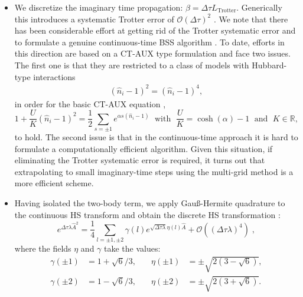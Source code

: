 \begin{itemize}
\item  We discretize the imaginary time propagation: $\beta = \Delta \tau L_{\text{Trotter}} $. Generically this introduces a systematic Trotter error of $\mathcal{O}(\Delta \tau)^2$  \cite{Fye86}. 
We note that there has been considerable effort at getting rid of the Trotter systematic error and to formulate a genuine continuous-time BSS  algorithm \cite{Iazzi15}.   To date, efforts in this direction are based on a CT-AUX type formulation \cite{Rombouts99,Gull08} and face two issues. The first one is that they are restricted to a class of models with Hubbard-type interactions
\begin{align}
        (\hat{n}_{i}- 1)^{2}  = (\hat{n}_{i}- 1)^{4} ,
\end{align}
in order for the basic CT-AUX equation \cite{Rombouts98},
\begin{equation}
          1   + \frac{U}{K} \left(  \hat{n}_{i}- 1\right)^{2}    = \frac{1}{2}\sum_{s=\pm 1}   e^{ \alpha s \left(  \hat{n}_{i}- 1\right) }  \; \text{ with  }  \;  \frac{U}{K} = \cosh(\alpha) -1 \; \text{ and  }  \; K\in\mathbb{R},
\end{equation}
to hold.
The second issue is that in the continuous-time  approach it is hard to formulate a  computationally efficient algorithm.  Given this situation, if eliminating the Trotter systematic error is required, it turns out that extrapolating to small imaginary-time steps using the multi-grid method \cite{Rost12,Rost13,Bluemer08} is a more efficient scheme.
\item  Having isolated the two-body term, we apply Gau\ss{}-Hermite quadrature \cite{goth2020} to the 
continuous HS transform and obtain the discrete HS transformation \cite{Motome97,Assaad97}:
\begin{equation}
\label{HS_squares}
        e^{\Delta \tau  \lambda  \hat{A}^2 } = \frac{1}{4}
        \sum_{ l = \pm 1, \pm 2}  \gamma(l)
e^{ \sqrt{\Delta \tau \lambda }
       \eta(l)  \hat{A} }
                + \mathcal{O} \left(  (\Delta \tau \lambda)^4\right) \;,
\end{equation}
where the fields $\eta$ and $\gamma$ take the values:
\begin{equation} \label{eta_gamma_fields}
\begin{aligned}
\gamma(\pm 1) &= 1 + \sqrt{6}/3, \quad & \eta(\pm 1 ) &= \pm \sqrt{2 \left(3 - \sqrt{6} \right)},\\
\gamma(\pm 2) &= 1 - \sqrt{6}/3, \quad & \eta(\pm 2 ) &= \pm \sqrt{2 \left(3 + \sqrt{6} \right)}.

\end{aligned}
\end{equation}
\end{itemize}

